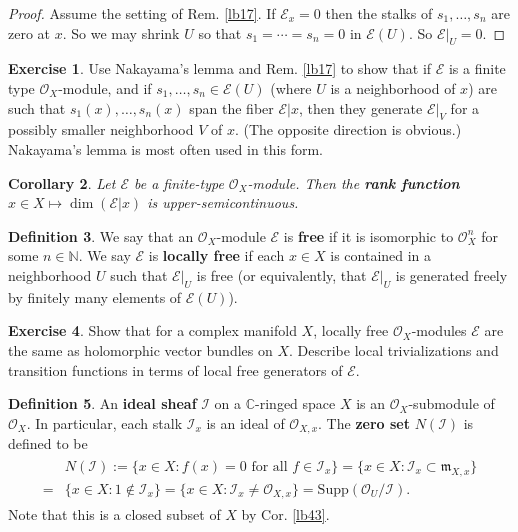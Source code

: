 \documentclass[12pt,b5paper,notitlepage]{report}
\theoremstyle{definition}
\newtheorem{df}{Definition}[section]
\newtheorem{exe}[df]{Exercise}
\theoremstyle{plain}
\newtheorem{co}[df]{Corollary}
\newcommand{\fk}{\mathfrak}
\newcommand{\mc}{\mathcal}
\newcommand{\scr}{\mathscr}
\newcommand{\Cbb}{\mathbb C}
\newcommand{\Nbb}{\mathbb N}
\newcommand{\Supp}{\mathrm{Supp}}
\numberwithin{equation}{section}
\begin{document}
\begin{proof}
Assume the setting of Rem. \ref{lb17}. If $\scr E_x=0$ then the stalks of $s_1,\dots,s_n$ are zero at $x$. So we may shrink $U$ so that $s_1=\cdots=s_n=0$ in $\scr E(U)$. So $\scr E|_U=0$.
\end{proof}






\begin{exe}\label{lb64}
Use Nakayama's lemma and Rem. \ref{lb17} to show that if $\scr E$ is a finite type $\scr O_X$-module, and if $s_1,\dots,s_n\in\scr E(U)$ (where $U$ is a neighborhood of $x$) are such that $s_1(x),\dots,s_n(x)$ span the fiber $\scr E|x$, then they generate $\scr E|_V$ for a possibly smaller neighborhood $V$ of $x$. (The opposite direction is obvious.) Nakayama's lemma is most often used in this form.
\end{exe}


\begin{co}\label{lb351}
Let $\scr E$ be a finite-type $\scr O_X$-module. Then the \textbf{rank function}  $x\in X\mapsto \dim(\scr E|x)$ is upper-semicontinuous.
\end{co}


\begin{df}
We say that an $\scr O_X$-module $\scr E$ is \textbf{free} if it is isomorphic to $\scr O_X^n$ for some $n\in\Nbb$. We say $\scr E$ is \textbf{locally free} if each $x\in X$ is contained in a neighborhood $U$ such that $\scr E|_U$ is free (or equivalently, that $\scr E|_U$ is generated freely by finitely many elements of $\scr E(U)$).
\end{df}

\begin{exe}
Show that for a complex manifold $X$, locally free $\scr O_X$-modules $\scr E$ are the same as holomorphic vector bundles on $X$. Describe local trivializations and transition functions in terms of local free generators of $\scr E$. %
\end{exe}


\begin{df}
An \textbf{ideal sheaf}  $\mc I$ on a $\Cbb$-ringed space $X$ is an $\scr O_X$-submodule of $\scr O_X$. In particular, each stalk $\mc I_x$ is an ideal of $\scr O_{X,x}$. The \textbf{zero set} $N(\mc I)$ \index{00@Zero sets $N(\mc I)$} is defined to be
\begin{align}
\begin{aligned}\label{eq3}
&N(\mc I):=\{x\in X:f(x)=0\text{ for all }f\in\mc I_x\}=\{x\in X:\mc I_x\subset\fk m_{X,x}\}\\
=&\{x\in X:1\notin\mc I_x\}=\{x\in X:\mc I_x\neq\scr O_{X,x}\}=\Supp(\scr O_U/\mc I).
\end{aligned}
\end{align}
Note that this is a closed subset of $X$ by Cor. \ref{lb43}.
\end{df}
\end{document}
